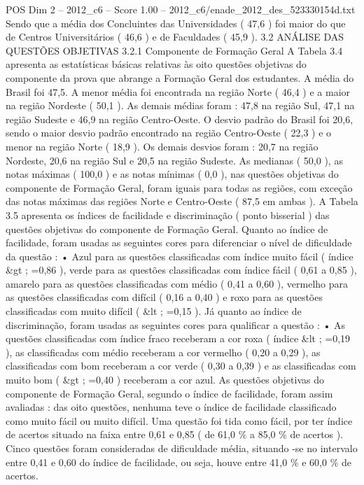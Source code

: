 \begin{textsample}{POS Dim 2 – 2012\_c6 – Score 1.00 – 2012\_c6/enade\_2012\_des\_523330154d.txt}
Sendo que a média dos Concluintes das Universidades ( 47,6 ) foi maior do que de Centros Universitários ( 46,6 ) e de Faculdades ( 45,9 ). 3.2 ANÁLISE DAS QUESTÕES OBJETIVAS 3.2.1 Componente de Formação Geral A Tabela 3.4 apresenta as estatísticas básicas relativas às oito questões objetivas do componente da prova que abrange a Formação Geral dos estudantes.
A média do Brasil foi 47,5.
A menor média foi encontrada na região Norte ( 46,4 ) e a maior na região Nordeste ( 50,1 ).
As demais médias foram : 47,8 na região Sul, 47,1 na região Sudeste e 46,9 na região Centro-Oeste.
O desvio padrão do Brasil foi 20,6, sendo o maior desvio padrão encontrado na região Centro-Oeste ( 22,3 ) e o menor na região Norte ( 18,9 ).
Os demais desvios foram : 20,7 na região Nordeste, 20,6 na região Sul e 20,5 na região Sudeste.
As medianas ( 50,0 ), as notas máximas ( 100,0 ) e as notas mínimas ( 0,0 ), nas questões objetivas do componente de Formação Geral, foram iguais para todas as regiões, com exceção das notas máximas das regiões Norte e Centro-Oeste ( 87,5 em ambas ).
A Tabela 3.5 apresenta os índices de facilidade e discriminação ( ponto bisserial ) das questões objetivas do componente de Formação Geral.
Quanto ao índice de facilidade, foram usadas as seguintes cores para diferenciar o nível de dificuldade da questão : • Azul para as questões classificadas com índice muito fácil ( índice \&gt ; =0,86 ), verde para as questões classificadas com índice fácil ( 0,61 a 0,85 ), amarelo para as questões classificadas com médio ( 0,41 a 0,60 ), vermelho para as questões classificadas com difícil ( 0,16 a 0,40 ) e roxo para as questões classificadas com muito difícil ( \&lt ; =0,15 ).
Já quanto ao índice de discriminação, foram usadas as seguintes cores para qualificar a questão : • As questões classificadas com índice fraco receberam a cor roxa ( índice \&lt ; =0,19 ), as classificadas com médio receberam a cor vermelho ( 0,20 a 0,29 ), as classificadas com bom receberam a cor verde ( 0,30 a 0,39 ) e as classificadas com muito bom ( \&gt ; =0,40 ) receberam a cor azul.
As questões objetivas do componente de Formação Geral, segundo o índice de facilidade, foram assim avaliadas : das oito questões, nenhuma teve o índice de facilidade classificado como muito fácil ou muito difícil.
Uma questão foi tida como fácil, por ter índice de acertos situado na faixa entre 0,61 e 0,85 ( de 61,0 \% a 85,0 \% de acertos ).
Cinco questões foram consideradas de dificuldade média, situando -se no intervalo entre 0,41 e 0,60 do índice de facilidade, ou seja, houve entre 41,0 \% e 60,0 \% de acertos.

\end{textsample}
